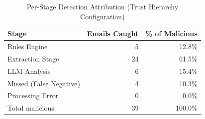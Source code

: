 \begin{table}[h]
\centering
\caption{Per-Stage Detection Attribution (Trust Hierarchy Configuration)}
\label{tab:e6_stage_attribution}
\begin{tabular}{l r r}
\hline
Stage & Emails Caught & \% of Malicious \\
\hline
Rules Engine & 5 & 12.8\% \\
Extraction Stage & 24 & 61.5\% \\
LLM Analysis & 6 & 15.4\% \\
Missed (False Negative) & 4 & 10.3\% \\
Processing Error & 0 & 0.0\% \\
\hline
Total malicious & 39 & 100.0\% \\
\hline
\end{tabular}
\end{table}